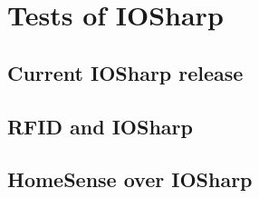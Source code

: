 \chapter{Tests of IOSharp}\label{C:IOSharp Implementation}

\section{Current IOSharp release}\label{S:current-iosharp-release}
\section{RFID and IOSharp}\label{S:rfid-iosharp}
\section{HomeSense over IOSharp}\label{S:HomeSense-IOSharp}